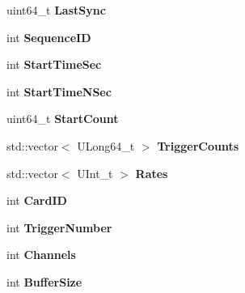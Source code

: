 \begin{DoxyCompactItemize}
\item 
\hypertarget{classCardData_a68649c499d7610955e7a9b143142e224}{uint64\-\_\-t {\bfseries Last\-Sync}}\label{classCardData_a68649c499d7610955e7a9b143142e224}

\item 
\hypertarget{classCardData_a4fdf5313faebd27fee17096a31d0e28e}{int {\bfseries Sequence\-I\-D}}\label{classCardData_a4fdf5313faebd27fee17096a31d0e28e}

\item 
\hypertarget{classCardData_a1297c0ccdeb5cb134cef3c92e01a36ed}{int {\bfseries Start\-Time\-Sec}}\label{classCardData_a1297c0ccdeb5cb134cef3c92e01a36ed}

\item 
\hypertarget{classCardData_af5393836942c9d857039e8b11bac2952}{int {\bfseries Start\-Time\-N\-Sec}}\label{classCardData_af5393836942c9d857039e8b11bac2952}

\item 
\hypertarget{classCardData_a7bd1f3c2269b6c7d3f12ffdd59efa1e6}{uint64\-\_\-t {\bfseries Start\-Count}}\label{classCardData_a7bd1f3c2269b6c7d3f12ffdd59efa1e6}

\item 
\hypertarget{classCardData_a816053ce45a07b8f7a7e5bfd914c51db}{std\-::vector$<$ U\-Long64\-\_\-t $>$ {\bfseries Trigger\-Counts}}\label{classCardData_a816053ce45a07b8f7a7e5bfd914c51db}

\item 
\hypertarget{classCardData_ab44adb08a1c2de7f4d24463325c87934}{std\-::vector$<$ U\-Int\-\_\-t $>$ {\bfseries Rates}}\label{classCardData_ab44adb08a1c2de7f4d24463325c87934}

\item 
\hypertarget{classCardData_a36cb9c0f73fcf5eae251e0a2b1b2bd0f}{int {\bfseries Card\-I\-D}}\label{classCardData_a36cb9c0f73fcf5eae251e0a2b1b2bd0f}

\item 
\hypertarget{classCardData_a6307217de93243eb7b0aa9931f02f706}{int {\bfseries Trigger\-Number}}\label{classCardData_a6307217de93243eb7b0aa9931f02f706}

\item 
\hypertarget{classCardData_a98f397c0dd49007942f5f25c8cbc67f0}{int {\bfseries Channels}}\label{classCardData_a98f397c0dd49007942f5f25c8cbc67f0}

\item 
\hypertarget{classCardData_a82c5fd806c6529cf7a9625dc262f9e8d}{int {\bfseries Buffer\-Size}}\label{classCardData_a82c5fd806c6529cf7a9625dc262f9e8d}


\end{DoxyCompactItemize}
